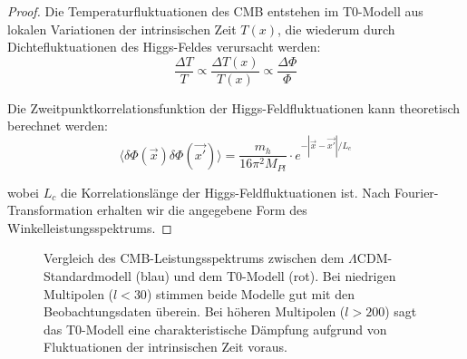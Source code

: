 \documentclass{article}
\theoremstyle{definition}
\theoremstyle{remark}
\newcommand{\Tfield}{T(x)} %
\begin{document}
		\begin{proof}
			Die Temperaturfluktuationen des CMB entstehen im T0-Modell aus lokalen Variationen der intrinsischen Zeit $\Tfield$, die wiederum durch Dichtefluktuationen des Higgs-Feldes verursacht werden:
			\begin{equation}
				\frac{\Delta T}{T} \propto \frac{\Delta \Tfield}{\Tfield} \propto \frac{\Delta \Phi}{\Phi}
			\end{equation}
			
			Die Zweitpunktkorrelationsfunktion der Higgs-Feldfluktuationen kann theoretisch berechnet werden:
			\begin{equation}
				\langle \delta\Phi(\vec{x}) \delta\Phi(\vec{x'}) \rangle = \frac{m_h}{16\pi^2 M_{Pl}} \cdot e^{-|\vec{x}-\vec{x'}|/L_c}
			\end{equation}
			
			wobei $L_c$ die Korrelationslänge der Higgs-Feldfluktuationen ist. Nach Fourier-Transformation erhalten wir die angegebene Form des Winkelleistungsspektrums.
		\end{proof}
		
		\begin{figure}[h]
			\centering
			\caption{Vergleich des CMB-Leistungsspektrums zwischen dem $\Lambda$CDM-Standardmodell (blau) und dem T0-Modell (rot). Bei niedrigen Multipolen ($l < 30$) stimmen beide Modelle gut mit den Beobachtungsdaten überein. Bei höheren Multipolen ($l > 200$) sagt das T0-Modell eine charakteristische Dämpfung aufgrund von Fluktuationen der intrinsischen Zeit voraus.}
			\label{fig:cmb-spectrum}
		\end{figure}
		
\end{document}
